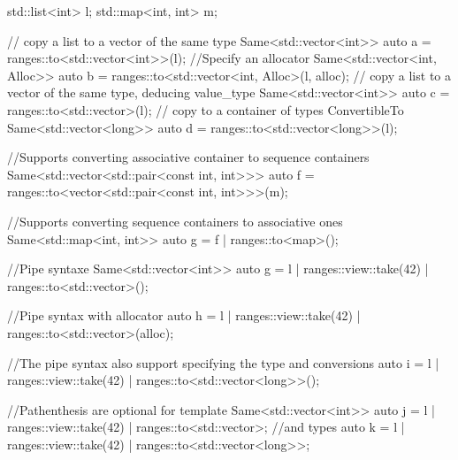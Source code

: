 \documentclass{wg21}
\begin{document}
\begin{colorblock}
std::list<int>  l;
std::map<int, int> m;

// copy a list to a vector of the same type
Same<std::vector<int>> auto a = ranges::to<std::vector<int>>(l);
//Specify an allocator
Same<std::vector<int, Alloc>> auto b = ranges::to<std::vector<int, Alloc>(l, alloc);
// copy a list to a vector of the same type, deducing value_type
Same<std::vector<int>> auto c = ranges::to<std::vector>(l);
// copy to a container of types ConvertibleTo
Same<std::vector<long>> auto d = ranges::to<std::vector<long>>(l);


//Supports converting associative container to sequence containers
Same<std::vector<std::pair<const int, int>>>
	auto f = ranges::to<vector<std::pair<const int, int>>>(m);

//Supports converting sequence containers to associative ones
Same<std::map<int, int>> auto g = f | ranges::to<map>();

//Pipe syntaxe
Same<std::vector<int>> auto g = l | ranges::view::take(42) | ranges::to<std::vector>();

//Pipe syntax with allocator
auto h = l | ranges::view::take(42) | ranges::to<std::vector>(alloc);

//The pipe syntax also support specifying the type and conversions
auto i = l | ranges::view::take(42) | ranges::to<std::vector<long>>();

//Pathenthesis are optional for template
Same<std::vector<int>> auto j = l | ranges::view::take(42) | ranges::to<std::vector>;
//and types
auto k = l | ranges::view::take(42) | ranges::to<std::vector<long>>;

\end{colorblock}

\pagebreak
\end{document}
